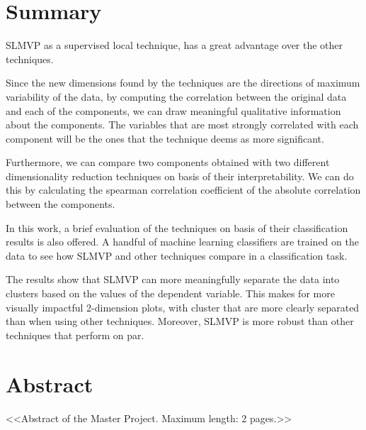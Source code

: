 \chapter*{Summary}



SLMVP as a supervised local technique, has a great advantage over the other techniques.

Since the new dimensions found by the techniques are the directions of maximum variability of the data, by computing the correlation between the original data and each of the components, we can draw meaningful qualitative information about the components. The variables that are most strongly correlated with each component will be the ones that the technique deems as more significant.

Furthermore, we can compare two components obtained with two different dimensionality reduction techniques on basis of their interpretability. We can do this by calculating the spearman correlation coefficient of the absolute correlation between the components.

In this work, a brief evaluation of the techniques on basis of their classification results is also offered. A handful of machine learning classifiers are trained on the data to see how SLMVP and other techniques compare in a classification task.

The results show that SLMVP can more meaningfully separate the data into clusters based on the values of the dependent variable. This makes for more visually impactful 2-dimension plots, with cluster that are more clearly separated than when using other techniques. Moreover, SLMVP is more robust than other techniques that perform on par.

\newpage

\chapter*{Abstract}

<<Abstract of the Master Project. Maximum length: 2 pages.>>


